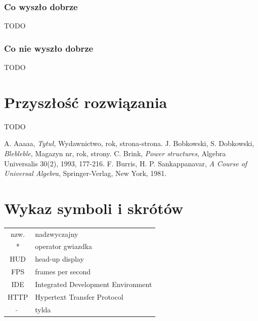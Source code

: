 \documentclass[a4paper,11pt,twoside]{report}
\theoremstyle{definition}
\begin{document}
\subsection {Co wyszło dobrze}
TODO

\subsection {Co nie wyszło dobrze}
TODO

\chapter {Przyszłość rozwiązania}
TODO


\begin{thebibliography}{20}%

 A. Aaaaa, \emph{Tytuł}, Wydawnictwo, rok, strona-strona.
 J. Bobkowski, S. Dobkowski, \emph{Blebleble}, Magazyn nr, rok, strony.
 C. Brink, \emph{Power structures}, Algebra Universalis 30(2), 1993, 177-216.
 F. Burris, H. P. Sankappanavar, \emph{A Course of Universal Algebra}, Springer-Verlag, New York, 1981.
\end{thebibliography}
\thispagestyle{empty}


\chapter*{Wykaz symboli i skrótów}

\begin{tabular}{cl}
nzw. & nadzwyczajny \\
* & operator gwiazdka \\
HUD & head-up display \\
FPS & frames per second \\
IDE & Integrated Development Environment \\
HTTP & Hypertext Transfer Protocol \\
$\widetilde{}$ & tylda
\end{tabular}
\thispagestyle{empty}


\listoffigures
\thispagestyle{empty}
\end{document}
